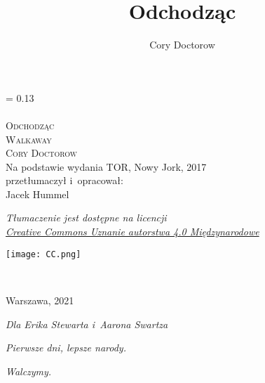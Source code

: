 \documentclass[oneside,polish,11pt,sfheadings]{mwbk}
\begin{document}
\title{Odchodząc}
\author{Cory Doctorow}


\DeclareRobustCommand{\cs}[1]{\texttt{\char`\\#1}}
\newlength{\tpheight}\setlength{\tpheight}{0.9\textheight}
\newlength{\txtheight}\setlength{\txtheight}{0.9\tpheight}
\newlength{\tpwidth}\setlength{\tpwidth}{0.9\textwidth}
\newlength{\txtwidth}\setlength{\txtwidth}{0.9\tpwidth}
\newlength{\drop}
\newcommand*{\titleSI}{\begingroup%
\drop = 0.13\txtheight
\centering
{\Huge \textsf{~}}\\[1\baselineskip]
{\huge \textsf{~}}\\[1\baselineskip]
{\Huge \textsc{Odchodząc}}\\[1\baselineskip]
{\LARGE \textsc{Walkaway}}\\[2\baselineskip]
{\huge \textsc{Cory Doctorow}}\\[4\baselineskip]
{\large Na podstawie wydania TOR, Nowy Jork, 2017 \\ przetłumaczył i~opracował:}\\
{\Large Jacek Hummel}\\[1\baselineskip]
{\normalsize \textit{Tłumaczenie jest dostępne na licencji\\
\href{https://creativecommons.org/licenses/by/4.0/deed.pl}{Creative Commons Uznanie autorstwa 4.0 Międzynarodowe}} \\ [1\baselineskip] \par}
\texttt{[image: CC.png]}

~

\vfill
{\Large {Warszawa, 2021}}\\
\endgroup}
\titleSI
\thispagestyle{empty}

\begin{figure}[p]
    \vspace*{-1cm}
\end{figure}
\thispagestyle{empty}


\newpage
\thispagestyle{empty}

\vspace*{100mm}

\begin{flushright}

\textit{Dla Erika Stewarta i~Aarona Swartza}

\textit{Pierwsze dni, lepsze narody.}

\textit{Walczymy.}


\end{flushright}
\end{document}
